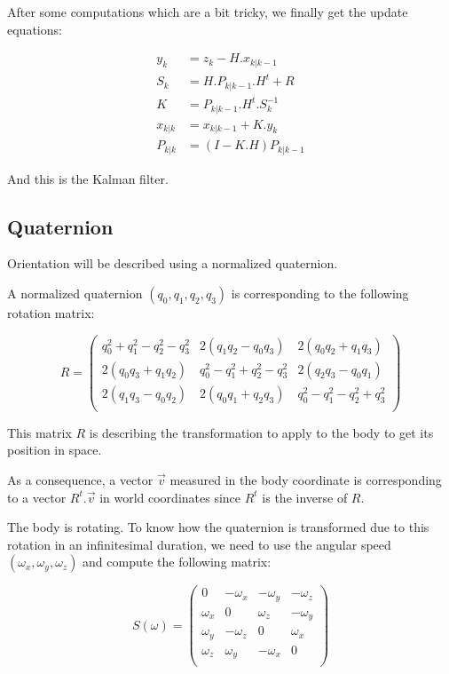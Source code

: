 \documentclass[titlepage,a4,12pt]{article}
\numberwithin{equation}{subsection}
\newcommand{\before}[1]{#1_{k|k-1}}
\newcommand{\after}[1]{#1_{k|k}}
\begin{document}
After some computations which are a bit tricky, we finally get the update equations:

\begin{align}
y_k &= z_k - H . \before{x} \\
S_k &= H . \before{P} . H^t + R \\ 
K &= \before{P} . H^t . S_k^{-1} \\ 
\after{x} &= \before{x} + K . y_k \\ 
\after{P} &= (I - K . H) \before{P}
\end{align}

And this is the Kalman filter.

\subsection{Quaternion}

Orientation will be described using a normalized quaternion.

A normalized quaternion $(q_0,q_1,q_2,q_3)$ is corresponding to the following rotation matrix:

\begin{equation}\label{eq:quattorot}
R = \left(
\begin{array}{ccc}
 q_0^2+q_1^2-q_2^2-q_3^2 & 2 (q_1 q_2-q_0 q_3) & 2 (q_0 q_2+q_1 q_3) \\
 2 (q_0 q_3+q_1 q_2) & q_0^2-q_1^2+q_2^2-q_3^2 & 2 (q_2 q_3-q_0 q_1) \\
 2 (q_1 q_3-q_0 q_2) & 2 (q_0 q_1+q_2 q_3) & q_0^2-q_1^2-q_2^2+q_3^2 \\
\end{array}
\right)
\end{equation}

This matrix $R$ is describing the transformation to apply to the body to get its position in space.

As a consequence, a vector $\overrightarrow{v}$ measured in the body coordinate is corresponding to a vector $R^t . \overrightarrow{v}$ in world coordinates since $R^t$ is the inverse of $R$.

The body is rotating. To know how the quaternion is transformed due to this rotation in an infinitesimal duration, we need to use the angular speed $(\omega_x, \omega_y, \omega_z)$ and compute the following matrix:

\begin{equation}\label{eq:quatrot}
S(\omega) = \left(
\begin{array}{cccc}
 0 & -\omega_x & -\omega_y & -\omega_z \\
 {\omega_x} & 0 & {\omega_z} & -{\omega_y} \\
 {\omega_y} & -{\omega_z} & 0 & {\omega_x} \\
 {\omega_z} & {\omega_y} & -{\omega_x} & 0 \\
\end{array}
\right)
\end{equation}
\end{document}
